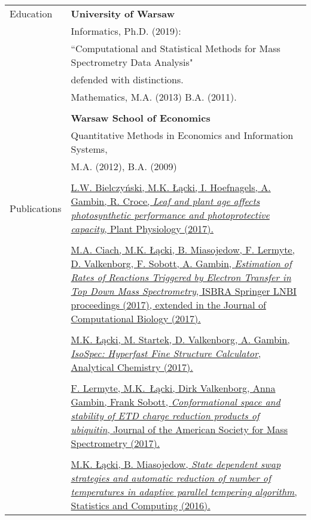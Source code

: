 \documentclass[letterpaper,11pt,oneside]{article}
\begin{document}
\noindent \begin{tabular}{@{} l l}
 \Large{Education}    & \textbf{University of Warsaw} \\
    & Informatics, Ph.D. (2019):\\
    & ``Computational and Statistical Methods for Mass Spectrometry Data Analysis"\\
    & defended with distinctions.\\
    & Mathematics, M.A. (2013) B.A. (2011).\\
    & \\
    & \textbf{Warsaw School of Economics} \\
    & Quantitative Methods in Economics and Information Systems,\\
    & M.A. (2012), B.A. (2009)\\
    & \\
\Large{Publications}
    & \parbox{5.0in}{\href{http://www.plantphysiol.org/content/early/2017/10/10/pp.17.00904}{L.W. Bielczyński, M.K. Łącki, I. Hoefnagels, A. Gambin, R. Croce, \textit{Leaf and plant age affects photosynthetic performance and photoprotective capacity}, Plant Physiology (2017).}}\\
    & \\
    & \parbox{5.0in}{\href{http://online.liebertpub.com/doi/10.1089/cmb.2017.0156}{M.A. Ciach, M.K. Łącki, B. Miasojedow, F. Lermyte, D. Valkenborg, F. Sobott, A. Gambin, \textit{Estimation of Rates of Reactions Triggered by Electron Transfer in Top Down Mass Spectrometry}, ISBRA Springer LNBI proceedings (2017), extended in the Journal of Computational Biology (2017).}}\\
    & \\
    & \parbox{5.0in}{\href{http://pubs.acs.org/doi/abs/10.1021/acs.analchem.6b01459}{M.K. Łącki, M. Startek, D. Valkenborg, A. Gambin, \textit{IsoSpec: Hyperfast Fine Structure Calculator}, Analytical Chemistry (2017).}}\\
    & \\
    & \parbox{5.0in}{\href{https://link.springer.com/article/10.1007/s13361-016-1444-7}{F. Lermyte, M.K. Łącki, Dirk Valkenborg, Anna Gambin, Frank Sobott, \textit{Conformational space and stability of ETD charge reduction products of ubiquitin}, Journal of the American Society for Mass Spectrometry (2017).}}\\
    & \\
    & \parbox{5.0in}{\href{https://link.springer.com/article/10.1007/s11222-015-9579-0}{M.K. Łącki, B. Miasojedow, \textit{State dependent swap strategies and automatic reduction of number of temperatures in adaptive parallel tempering algorithm}, Statistics and Computing (2016).}}\\

\end{tabular}
\end{document}
